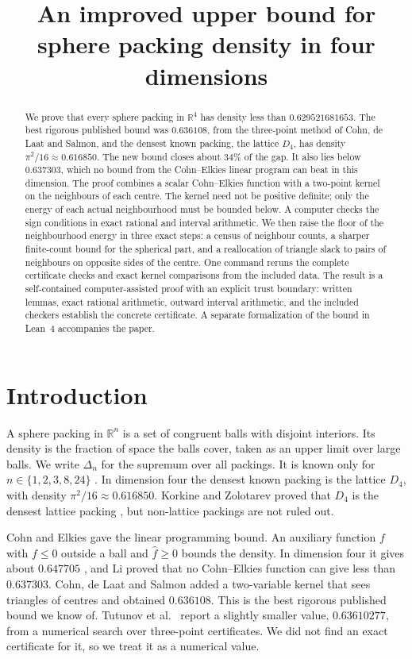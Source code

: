 \documentclass[11pt]{amsart}
\title{An improved upper bound for sphere packing density in four dimensions}
\numberwithin{equation}{section}
\theoremstyle{remark}
\newcommand{\R}{\mathbb{R}}
\begin{document}
\begin{abstract}
We prove that every sphere packing in $\R^4$ has density less than $0.629521681653$. The best rigorous published bound was $0.636108$, from the three-point method of Cohn, de Laat and Salmon, and the densest known packing, the lattice $D_4$, has density $\pi^2/16\approx0.616850$. The new bound closes about $34\%$ of the gap. It also lies below $0.637303$, which no bound from the Cohn--Elkies linear program can beat in this dimension. The proof combines a scalar Cohn--Elkies function with a two-point kernel on the neighbours of each centre. The kernel need not be positive definite; only the energy of each actual neighbourhood must be bounded below. A computer checks the sign conditions in exact rational and interval arithmetic. We then raise the floor of the neighbourhood energy in three exact steps: a census of neighbour counts, a sharper finite-count bound for the spherical part, and a reallocation of triangle slack to pairs of neighbours on opposite sides of the centre. One command reruns the complete certificate checks and exact kernel comparisons from the included data. The result is a self-contained computer-assisted proof with an explicit trust boundary: written lemmas, exact rational arithmetic, outward interval arithmetic, and the included checkers establish the concrete certificate. A separate formalization of the bound in Lean~4 accompanies the paper.
\end{abstract}

\maketitle

\section{Introduction}

A sphere packing in $\R^n$ is a set of congruent balls with disjoint interiors. Its density is the fraction of space the balls cover, taken as an upper limit over large balls. We write $\Delta_n$ for the supremum over all packings. It is known only for $n\in\{1,2,3,8,24\}$ \cite{Thue,FejesToth,Hales,Viazovska,CKMRV}. In dimension four the densest known packing is the lattice $D_4$, with density $\pi^2/16\approx0.616850$. Korkine and Zolotarev proved that $D_4$ is the densest lattice packing \cite{KZ}, but non-lattice packings are not ruled out.

Cohn and Elkies \cite{CE} gave the linear programming bound. An auxiliary function $f$ with $f\le0$ outside a ball and $\hat f\ge0$ bounds the density. In dimension four it gives about $0.647705$ \cite[Table~1.1]{CdLS}, and Li \cite{Li} proved that no Cohn--Elkies function can give less than $0.637303$. Cohn, de Laat and Salmon \cite{CdLS} added a two-variable kernel that sees triangles of centres and obtained $0.636108$. This is the best rigorous published bound we know of. Tutunov et al.\ \cite{Tutunov} report a slightly smaller value, $0.63610277$, from a numerical search over three-point certificates. We did not find an exact certificate for it, so we treat it as a numerical value.
\end{document}
